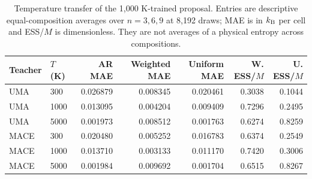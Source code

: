 \begin{table}[htbp]
\centering\small
\caption{Temperature transfer of the 1,000 K-trained proposal. Entries are descriptive equal-composition averages over $n=3,6,9$ at 8,192 draws; MAE is in $k_{\rm B}$ per cell and ESS/$M$ is dimensionless. They are not averages of a physical entropy across compositions.}
\begin{tabular}{llrrrrr}\toprule
Teacher & $T$ (K) & AR MAE & Weighted MAE & Uniform MAE & W. ESS/$M$ & U. ESS/$M$\\\midrule
UMA & 300 & 0.026879 & 0.008345 & 0.020461 & 0.3038 & 0.1044\\
UMA & 1000 & 0.013095 & 0.004204 & 0.009409 & 0.7296 & 0.2495\\
UMA & 5000 & 0.001973 & 0.008512 & 0.001763 & 0.6274 & 0.8259\\
MACE & 300 & 0.020480 & 0.005252 & 0.016783 & 0.6374 & 0.2549\\
MACE & 1000 & 0.013710 & 0.003133 & 0.011170 & 0.7420 & 0.3006\\
MACE & 5000 & 0.001984 & 0.009692 & 0.001704 & 0.6515 & 0.8267\\
\bottomrule\end{tabular}
\end{table}

